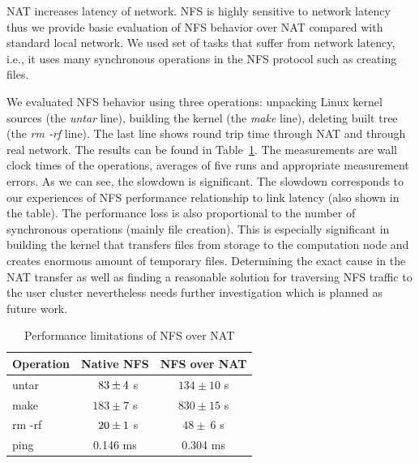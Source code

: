 \documentclass[a4paper]{article}
\begin{document}
NAT increases latency of network. NFS is highly sensitive to network latency
thus we provide basic evaluation of NFS behavior over NAT compared with standard
local network. We used set of tasks that suffer from network latency,
i.e., it uses many synchronous operations in the NFS protocol such as creating
files.

We evaluated NFS behavior using three operations: unpacking Linux
kernel sources (the \emph{untar} line), building the kernel (the \emph{make}
line), deleting built tree (the \emph{rm -rf} line). The last line shows round
trip time through NAT and through real network. The results can be found in 
Table~\ref{tab:nateval}. The measurements are wall clock times of the
operations, averages of five runs and appropriate measurement errors.
As we can see, the slowdown is significant. The slowdown corresponds to our
experiences of NFS performance relationship to link latency (also shown in
the table). The performance loss is also proportional to the number of
synchronous operations (mainly file creation). This is especially
significant in building the kernel that transfers files from storage to the
computation node and creates enormous amount of temporary files.
Determining the exact cause in the NAT transfer
as well as finding a reasonable solution for
traversing NFS traffic to the user cluster nevertheless
needs further investigation which is planned as future work.

\begin{table}[htb]
\begin{center}
\begin{tabular}{|l|c|c|}
\hline
\bf Operation & \bf Native NFS & \bf NFS over NAT \\
\hline
\hline
untar & $\hphantom{1}83\pm4$ s & $134\pm10$ s \\
\hline
make & $183\pm7$ s & $830\pm15$ s \\
\hline
rm -rf & $\hphantom{1}20 \pm1$ s & \hphantom{1}$48 \pm~6$ s \\
\hline
ping & 0.146 ms & 0.304 ms \\
\hline
\end{tabular}
\end{center}
\caption{Performance limitations of NFS over NAT}
\label{tab:nateval}
\end{table}
\end{document}
